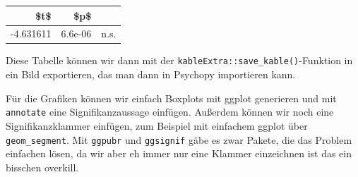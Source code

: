 \documentclass[
]{book}
\begin{document}
\begin{table}
\centering
\begin{tabular}[t]{rrl}
\toprule
\$t\$ & \$p\$ &  \\
\midrule
-4.631611 & 6.6e-06 & n.s.\\
\bottomrule
\end{tabular}
\end{table}

Diese Tabelle können wir dann mit der \texttt{kableExtra::save\_kable()}-Funktion in ein Bild exportieren, das man dann in Psychopy importieren kann.

Für die Grafiken können wir einfach Boxplots mit ggplot generieren und mit \texttt{annotate} eine Signifikanzaussage einfügen. Außerdem können wir noch eine Signifikanzklammer einfügen, zum Beispiel mit einfachem ggplot über \texttt{geom\_segment}. Mit \texttt{ggpubr} und \texttt{ggsignif} gäbe es zwar Pakete, die das Problem einfachen lösen, da wir aber eh immer nur eine Klammer einzeichnen ist das ein bisschen overkill.
\end{document}
